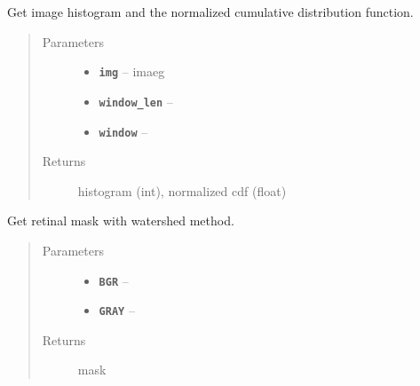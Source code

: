 \documentclass[letterpaper,10pt,english]{sphinxmanual}
\begin{document}

\begin{fulllineitems}
\label{RRtoolbox.lib.arrayops:RRtoolbox.lib.arrayops.mask.hist_cdf}
Get image histogram and the normalized cumulative distribution function.
\begin{quote}\begin{description}
\item[{Parameters}] \leavevmode\begin{itemize}
\item {} 
\textbf{\texttt{img}} -- imaeg

\item {} 
\textbf{\texttt{window\_len}} -- 

\item {} 
\textbf{\texttt{window}} -- 

\end{itemize}

\item[{Returns}] \leavevmode
histogram (int), normalized cdf (float)

\end{description}\end{quote}

\end{fulllineitems}


\begin{fulllineitems}
\label{RRtoolbox.lib.arrayops:RRtoolbox.lib.arrayops.mask.mask_watershed}
Get retinal mask with watershed method.
\begin{quote}\begin{description}
\item[{Parameters}] \leavevmode\begin{itemize}
\item {} 
\textbf{\texttt{BGR}} -- 

\item {} 
\textbf{\texttt{GRAY}} -- 

\end{itemize}

\item[{Returns}] \leavevmode
mask

\end{description}\end{quote}

\end{fulllineitems}
\end{document}
